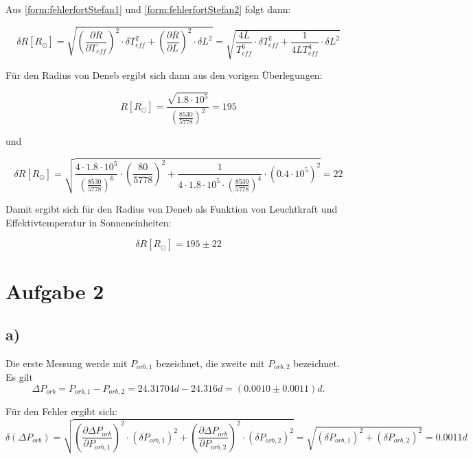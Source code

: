 \documentclass[titlepage]{scrartcl}
\begin{document}
Aus \eqref{form:fehlerfortStefan1} und \eqref{form:fehlerfortStefan2} folgt dann:

\begin{equation}
\delta R[R_{\odot}] = \sqrt{(\frac{\partial R}{\partial T_{eff}})^2 \cdot \delta T^2_{eff} + (\frac{\partial R}{\partial L})^2 \cdot \delta L^2} = \sqrt{\frac{4 L}{T^6_{eff}} \cdot \delta T^2_{eff} + \frac{1}{4 L T^4_{eff}} \cdot \delta L^2}
\end{equation}

Für den Radius von Deneb ergibt sich dann aus den vorigen Überlegungen:

\begin{equation}
R[R_{\odot}] = \frac{\sqrt{1.8 \cdot 10^5}} {(\frac{8530}{5778})^2} = 195
\end{equation}

und

\begin{equation}
\delta R[R_{\odot}] = \sqrt{\frac{4 \cdot 1.8 \cdot 10^5}{({\frac{8530}{5778}})^6} \cdot (\frac{80}{5778})^2 + \frac{1}{4 \cdot 1.8 \cdot 10^5 \cdot ({\frac{8530}{5778}})^4} \cdot (0.4 \cdot 10^5)^2} = 22
\end{equation}

Damit ergibt sich für den Radius von Deneb als Funktion von Leuchtkraft und Effektivtemperatur in Sonneneinheiten:

\begin{equation}
\delta R[R_{\odot}] = 195 \pm 22
\end{equation}


\section{Aufgabe 2} 
\subsection{a)} 
Die erste Messung werde mit $P_{orb, 1}$ bezeichnet, die zweite mit $P_{orb,2}$ bezeichnet. 
Es gilt 
\begin{equation}
\Delta P_{orb} = P_{orb, 1} - P_{orb, 2} = 24.31704 d - 24.316 d = (0.0010 \pm 0.0011) d.
\end{equation} 

Für den Fehler ergibt sich: 
\begin{equation}
\delta (\Delta P_{orb}) = \sqrt{(\frac{\partial \Delta P_{orb}}{\partial P_{orb, 1}})^2 \cdot (\delta P_{orb, 1})^2 + (\frac{\partial \Delta P_{orb}}{\partial P_{orb, 2}})^2 \cdot (\delta P_{orb, 2})^2} = \sqrt{(\delta P_{orb, 1})^2 + (\delta P_{orb, 2})^2} = 0.0011 d
\end{equation}
\end{document}
